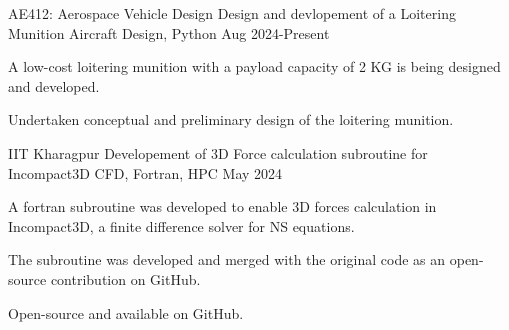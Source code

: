 
\begin{cventries}
  \cventry
  {AE412: Aerospace Vehicle Design} %
  {Design and devlopement of a Loitering Munition} %
  {Aircraft Design, Python} %
  {Aug 2024-Present} %
  {
    \begin{cvitems} %
      \item {A low-cost loitering munition with a payload capacity of 2 KG is being designed and developed.}
      \item {Undertaken conceptual and preliminary design of the loitering munition.}
    \end{cvitems}
  }

  \cventry
  {IIT Kharagpur} %
  {Developement of 3D Force calculation subroutine for Incompact3D} %
  {CFD, Fortran, HPC} %
  {May 2024} %
  {
    \begin{cvitems} %
      \item {A fortran subroutine was developed to enable 3D forces calculation in Incompact3D, a finite difference solver for NS equations.}
      \item {The subroutine was developed and merged with the original code as an open-source contribution on GitHub.}
      \item {Open-source and available on GitHub.}
    \end{cvitems}
  }


\end{cventries}
